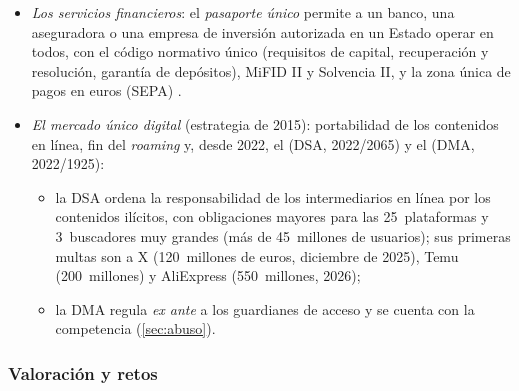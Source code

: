 \documentclass[11pt]{article}
\begin{document}
\begin{itemize}
\begin{itemize}
  \item \emph{general} para las demás, con posibles medidas compensatorias (periodo de prácticas o prueba de aptitud);
  \item la \emph{tarjeta profesional europea} electrónica, desde 2016, para enfermeros, farmacéuticos, fisioterapeutas, guías de montaña y agentes inmobiliarios;
  \item la Directiva (UE) 2018/958 obliga a hacer un \emph{test de proporcionalidad} antes de regular una profesión.\footnote{Las profesiones reguladas emplean en torno al 22~\% de los trabajadores de la Unión. El paquete de servicios de 2017 propuso además una tarjeta electrónica de servicios para facilitar los trámites de las empresas de construcción y de servicios a empresas, que el Parlamento Europeo rechazó.}
  \end{itemize}
  En septiembre de 2026 la Comisión propuso reformarla para hacer el reconocimiento digital y más rápido\nocite{CE2026Movilidad}.
\item \emph{Los servicios financieros}: el \emph{pasaporte único} permite a un banco, una aseguradora o una empresa de inversión autorizada en un Estado operar en todos, con el código normativo único (requisitos de capital, recuperación y resolución, garantía de depósitos), MiFID II y Solvencia II, y la zona única de pagos en euros (SEPA) .
\item \emph{El mercado único digital} (estrategia de 2015): portabilidad de los contenidos en línea, fin del \emph{roaming} y, desde 2022, el  (DSA, 2022/2065) y el  (DMA, 2022/1925)\nocite{UE2022DSA,UE2022DMA}:
  \begin{itemize}
  \item la DSA ordena la responsabilidad de los intermediarios en línea por los contenidos ilícitos, con obligaciones mayores para las 25~plataformas y 3~buscadores muy grandes (más de 45~millones de usuarios); sus primeras multas son a X (120~millones de euros, diciembre de 2025), Temu (200~millones) y AliExpress (550~millones, 2026)\nocite{CE2026DSA};
  \item la DMA regula \emph{ex ante} a los guardianes de acceso y se cuenta con la competencia (\ref{sec:abuso}).
  \end{itemize}
\end{itemize}

\subsubsection{Valoración y retos}\label{sec:servicios-valoracion}
\end{document}
